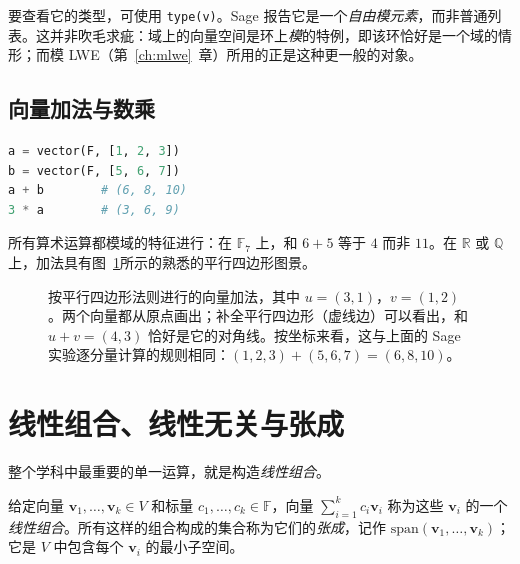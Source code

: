 要查看它的类型，可使用 \texttt{type(v)}。Sage 报告它是一个\emph{自由模元素}，而非普通列表。这并非吹毛求疵：域上的向量空间是环上\emph{模}的特例，即该环恰好是一个域的情形；而模 LWE（第~\ref{ch:mlwe}~章）所用的正是这种更一般的对象。

\subsection{向量加法与数乘}

\begin{lstlisting}[language=Python]
a = vector(F, [1, 2, 3])
b = vector(F, [5, 6, 7])
a + b        # (6, 8, 10)
3 * a        # (3, 6, 9)
\end{lstlisting}

所有算术运算都模域的特征进行：在 $\mathbb{F}_7$ 上，和 $6+5$ 等于 $4$ 而非 $11$。在 $\mathbb{R}$ 或 $\mathbb{Q}$ 上，加法具有图~\ref{fig:vector-addition}所示的熟悉的平行四边形图景。

\begin{figure}[H]
\centering
{}
\caption{按平行四边形法则进行的向量加法，其中 $u=(3,1)$，$v=(1,2)$。两个向量都从原点画出；补全平行四边形（虚线边）可以看出，和 $u+v=(4,3)$ 恰好是它的对角线。按坐标来看，这与上面的 Sage 实验逐分量计算的规则相同：$(1,2,3)+(5,6,7)=(6,8,10)$。}
\label{fig:vector-addition}
\end{figure}

\section{线性组合、线性无关与张成}
整个学科中最重要的单一运算，就是构造\emph{线性组合}。

\begin{definition}[线性组合与张成]
给定向量 $\mathbf{v}_1,\dots,\mathbf{v}_k \in V$ 和标量 $c_1,\dots,c_k\in\mathbb{F}$，向量 $\sum_{i=1}^k c_i\mathbf{v}_i$ 称为这些 $\mathbf{v}_i$ 的一个\emph{线性组合}。所有这样的组合构成的集合称为它们的\emph{张成}，记作 $\mathrm{span}(\mathbf{v}_1,\dots,\mathbf{v}_k)$；它是 $V$ 中包含每个 $\mathbf{v}_i$ 的最小子空间。
\end{definition}

